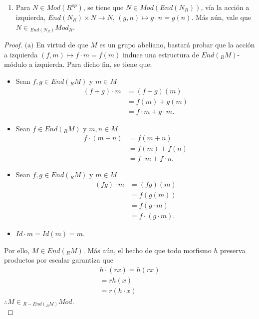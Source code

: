 \documentclass{article}
\newcommand{\lrprth}[1]{
	\left(#1\right)
}
\newcommand{\opst}[1]{
	{#1}^{op}
}
\theoremstyle{definition}
\theoremstyle{plain}
\theoremstyle{plain}
\theoremstyle{definition}
\theoremstyle{definition}
\theoremstyle{definition}
\theoremstyle{definition}
\theoremstyle{definition}
\theoremstyle{definition}
\begin{document}
\begin{enumerate}[label=\textbf{Ej \arabic*.}]
\begin{enumerate}
	\item Para $N \in Mod\lrprth{\opst{R}}$, se tiene que $N \in Mod\lrprth{End\lrprth{N_{R}}}$, vía la acción a izquierda, $End\lrprth{N_{R}} \times N \longrightarrow N$, $\lrprth{g,n} \mapsto g \cdot n = g\lrprth{n}$. Más aún, vale que $N \in {}_{End\lrprth{N_{R}}}Mod_{R}$.
\end{enumerate}
\begin{proof}
	$\boxed{\text{(a)}}$ En virtud de que $M$ es un grupo abeliano, bastará probar que la acción a izquierda $\lrprth{f,m} \mapsto f \cdot m = f\lrprth{m}$ induce una estructura de $End\lrprth{_{R}M}$-módulo a izquierda. Para dicho fin, se tiene que:
	\begin{itemize}
		\item Sean $f,g \in End\lrprth{_{R}M}$ y $m \in M$
		\begin{align*}
			\lrprth{f+g} \cdot m&=\lrprth{f+g}\lrprth{m}\\
			&=f\lrprth{m}+g\lrprth{m}\\
			&=f \cdot m+g \cdot m.
		\end{align*}
		\item Sean $f \in End\lrprth{_{R}M}$ y $m,n \in M$
		\begin{align*}
			f \cdot \lrprth{m+n}&=f\lrprth{m+n}\\
			&=f\lrprth{m}+f\lrprth{n}\\
			&=f \cdot m+f \cdot n.
		\end{align*}
		\item Sean $f,g \in End\lrprth{_{R}M}$ y $m \in M$
		\begin{align*}
			\lrprth{fg} \cdot m&=\lrprth{fg}\lrprth{m}\\
			&=f\lrprth{g\lrprth{m}}\\
			&=f\lrprth{g \cdot m}\\
			&=f \cdot \lrprth{g \cdot m}.
		\end{align*}
		\item $Id \cdot m=Id\lrprth{m}=m$.
	\end{itemize}
	Por ello, $M \in End\lrprth{_{R}M}$. Más aún, el hecho de que todo morfismo $h$ preserva productos por escalar garantiza que
	\begin{align*}
		h \cdot \lrprth{rx}=h\lrprth{rx}\\
		=rh\lrprth{x}\\
		=r\lrprth{h \cdot x}
	\end{align*}
	$\therefore M \in {}_{R-End\lrprth{_{R}M}}Mod$.\\
	

\end{proof}
\end{enumerate}
\end{document}
